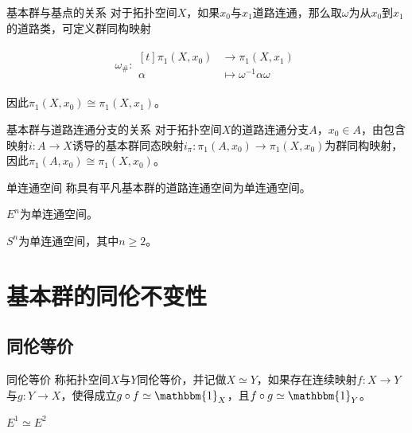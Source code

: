 \documentclass[lang = cn, scheme = chinese, thmcnt = section, usesamecnt]{elegantbook}
\newcommand{\function}[5]{
	\begin{align*}
		#1:\begin{aligned}[t]
			#2 &\longrightarrow #3\\
			#4 &\longmapsto #5
		\end{aligned}
	\end{align*}
}                                     %
\begin{document}
\begin{theorem}{基本群与基点的关系}
	对于拓扑空间$X$，如果$x_0$与$x_1$道路连通，那么取$\omega$为从$x_0$到$x_1$的道路类，可定义群同构映射
	\function{\omega_{\#}}{\pi_1(X,x_0)}{\pi_1(X,x_1)}{\alpha}{\omega^{-1}\alpha\omega}
	因此$\pi_1(X,x_0)\cong \pi_1(X,x_1)$。
\end{theorem}

\begin{theorem}{基本群与道路连通分支的关系}
	对于拓扑空间$X$的道路连通分支$A$，$x_0\in A$，由包含映射$i:A\to X$诱导的基本群同态映射$i_\pi:\pi_1(A,x_0)\to\pi_1(X,x_0)$为群同构映射，因此$\pi_1(A,x_0)\cong \pi_1(X,x_0)$。
\end{theorem}

\begin{definition}{单连通空间}
	称具有平凡基本群的道路连通空间为单连通空间。
\end{definition}

\begin{example}
	$E^n$为单连通空间。
\end{example}

\begin{example}
	$S^n$为单连通空间，其中$n\ge 2$。
\end{example}

\section{基本群的同伦不变性}

\subsection{同伦等价}

\begin{definition}{同伦等价}
	称拓扑空间$X$与$Y$同伦等价，并记做$X\simeq Y$，如果存在连续映射$f:X\to Y$与$g:Y\to X$，使得成立$g\circ f\simeq\mathbbm{1}_X$，且$f\circ g\simeq\mathbbm{1}_Y$。
\end{definition}

\begin{example}
	$E^1\simeq E^2$
\end{example}
\end{document}
